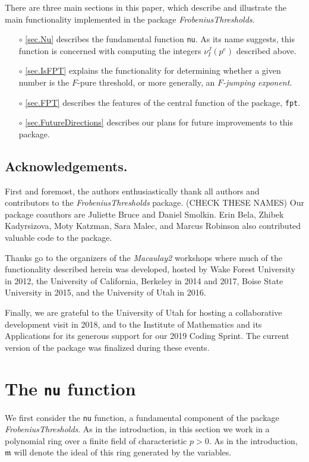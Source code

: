 \documentclass{amsart}
\newcommand{\idealm}{\mathfrak{m}}
\begin{document}
There are three main sections in this paper, which describe and illustrate the main functionality implemented in the package \emph{FrobeniusThresholds}.
\begin{itemize}
\item[$\circ$] \autoref{sec.Nu} describes the fundamental function {\tt nu}.  As its name suggests, this function is concerned with computing the integers $\nu_I^J(p^e)$ described above.
\item[$\circ$] \autoref{sec.IsFPT} explains the functionality for determining whether a given number is the $F$-pure threshold, or more generally, an \emph{$F$-jumping exponent}.
\item[$\circ$] \autoref{sec.FPT} describes the features of the central function of the package, {\tt fpt}.
\item[$\circ$]  \autoref{sec.FutureDirections} describes our plans for future improvements to this package.
\end{itemize}

\subsection*{Acknowledgements.}  First and foremost, the authors enthusiastically thank all authors and contributors to the
\emph{FrobeniusThresholds} package.  {\color{red} (CHECK THESE NAMES)}
Our package coauthors are Juliette Bruce and Daniel Smolkin.  Erin Bela, Zhibek Kadyrsizova, Moty Katzman, Sara Malec, and Marcus Robinson also contributed valuable code to the package.

Thanks go to the organizers of the \emph{Macaulay2} workshops where much of the functionality described herein was developed, hosted by Wake Forest University in 2012, the University of California, Berkeley in 2014 and 2017, Boise State University in 2015, and the University of Utah in 2016.

Finally, we are grateful to the University of Utah for hosting a collaborative development visit in 2018, and to the Institute of Mathematics and its Applications for its generous support for our 2019 Coding Sprint.
The current version of the package was finalized during these events.

\section{The {\tt nu} function}
\label{sec.Nu}


We first consider the {\tt nu} function, a fundamental component of the package \emph{FrobeniusThresholds}.   As in the introduction, in this section we work in a polynomial ring over a finite field of characteristic $p>0$.  As in the introduction, $\idealm$ will denote the ideal of this ring generated by the variables.
\end{document}

